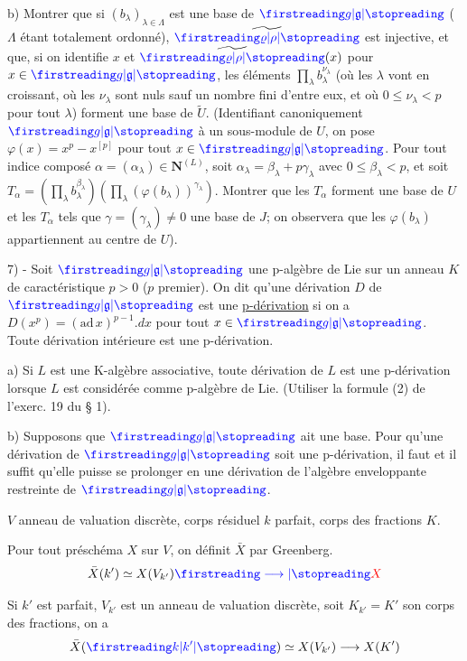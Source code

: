 b) Montrer que si $(b_\lambda)_{\lambda\in\Lambda}$ est une base de $\unsure{g|\mathfrak g}$ ($\Lambda$ étant totalement ordonné), $\widetilde{\unsure{\varrho|\rho}}$ est injective, et que, si on identifie $x$ et $\widetilde{\unsure{\varrho|\rho}}(x)$ pour $x\in\unsure{g|\mathfrak g}$, les éléments $\prod_\lambda b_\lambda^{\nu_\lambda}$ (où les $\lambda$ vont en croissant, où les $\nu_\lambda$ sont nuls sauf un nombre fini d'entre eux, et où $0\leq\nu_\lambda<p$ pour tout $\lambda$) forment une base de $\widetilde U$. (Identifiant canoniquement $\unsure{g|\mathfrak g}$ à un sous-module de $U$, on pose $\varphi(x)=x^p-x^{[p]}$ pour tout $x\in\unsure{g|\mathfrak g}$. Pour tout indice composé $\alpha=(\alpha_\lambda)\in\mathbf N^{(L)}$, soit $\alpha_\lambda=\beta_\lambda+p\gamma_\lambda$ avec $0\leq\beta_\lambda<p$, et soit $T_\alpha=(\prod_\lambda b_\lambda^{\beta_\lambda})(\prod_\lambda(\varphi(b_\lambda))^{\gamma_\lambda})$. Montrer que les $T_\alpha$ forment une base de $U$ et les $T_\alpha$ tels que $\gamma=(\gamma_\lambda)\ne0$ une base de $J$; on observera que les $\varphi(b_\lambda)$ appartiennent au centre de $U$).

7) - Soit $\unsure{g|\mathfrak g}$ une p-algèbre de Lie sur un anneau $K$ de caractéristique $p>0$ ($p$ premier). On dit qu'une dérivation $D$ de $\unsure{g|\mathfrak g}$ est une \uline{p-dérivation} si on a $D(x^p)=(\mathrm{ad}\,x)^{p-1}.dx$ pour tout $x\in\unsure{g|\mathfrak g}$. Toute dérivation intérieure est une p-dérivation.

a) Si $L$ est une K-algèbre associative, toute dérivation de $L$ est une p-dérivation lorsque $L$ est considérée comme p-algèbre de Lie. (Utiliser la formule (2) de l'exerc. 19 du § 1).

b) Supposons que $\unsure{g|\mathfrak g}$ ait une base. Pour qu'une dérivation de $\unsure{g|\mathfrak g}$ soit une p-dérivation, il faut et il suffit qu'elle puisse se prolonger en une dérivation de l'algèbre enveloppante restreinte de $\unsure{g|\mathfrak g}$.

$V$ anneau de valuation discrète, corps résiduel $k$ parfait, corps des fractions $K$.

Pour tout préschéma $X$ sur $V$, on définit $\bar X$ par Greenberg.
\[
\bar X(k')\simeq X(V_{k'})\deleted{\unsure{\longrightarrow}X}
\]

Si $k'$ est parfait, $V_{k'}$ est un anneau de valuation discrète, soit $K_{k'}=K'$ son corps des fractions, on a
\[
\bar X(\unsure{k|k'})\simeq X(V_{k'})\longrightarrow X(K')
\]

